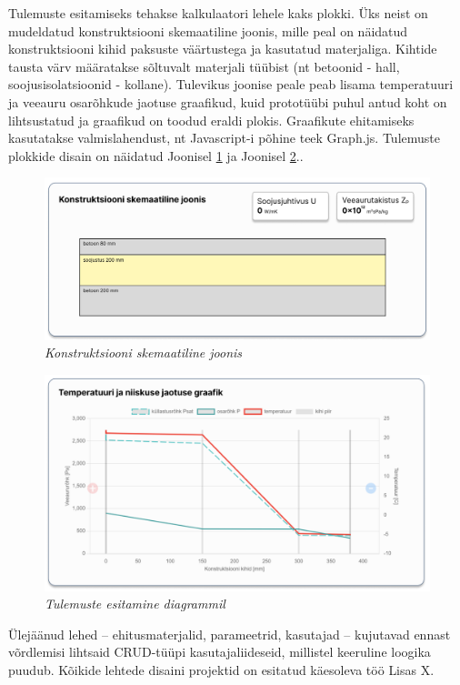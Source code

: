 Tulemuste esitamiseks tehakse kalkulaatori lehele kaks plokki. Üks neist on mudeldatud konstruktsiooni skemaatiline joonis,
mille peal on näidatud konstruktsiooni kihid paksuste väärtustega ja kasutatud materjaliga. Kihtide tausta värv määratakse
sõltuvalt materjali tüübist (nt betoonid - hall, soojusisolatsioonid - kollane). Tulevikus joonise peale peab lisama 
temperatuuri ja veeauru osarõhkude jaotuse graafikud, kuid prototüübi puhul antud koht on lihtsustatud ja graafikud
on toodud eraldi plokis. Graafikute ehitamiseks kasutatakse valmislahendust, nt Javascript-i põhine teek Graph.js.
Tulemuste plokkide disain on näidatud Joonisel \ref{fig:design_calc_drawing} ja Joonisel \ref{fig:design_calc_graph}..

\begin{figure}[ht]
    \centering
    \includegraphics[width=.8\textwidth]{figures/analysis/desing_calc_drawing.png}
    \caption[Konstruktsiooni skemaatiline joonis]{\textit{Konstruktsiooni skemaatiline joonis}}
    \label{fig:design_calc_drawing}
\end{figure}
\begin{figure}[ht]
    \centering
    \includegraphics[width=.8\textwidth]{figures/analysis/desing_calc_graph.png}
    \caption[Tulemuste esitamine diagrammil]{\textit{Tulemuste esitamine diagrammil}}
    \label{fig:design_calc_graph}
\end{figure}

Ülejäänud lehed -- ehitusmaterjalid, parameetrid, kasutajad -- kujutavad ennast võrdlemisi lihtsaid CRUD-tüüpi kasutajaliideseid, millistel
keeruline loogika puudub. Kõikide lehtede disaini projektid on esitatud käesoleva töö \colorbox{BurntOrange}{Lisas X}.